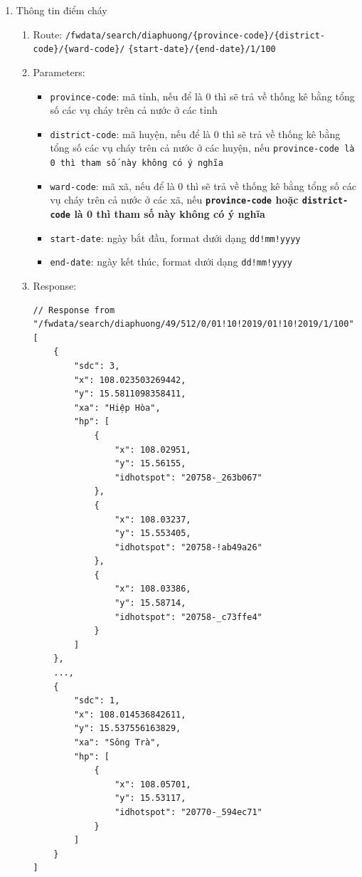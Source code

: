 \documentclass{article}
\begin{document}
\begin{enumerate}
	\item Thông tin điểm cháy
	      \begin{enumerate}
		      \item Route: {\texttt{/fwdata/search/diaphuong/\{province-code\}/\{district-code\}/\{ward-code\}/}
		            \linebreak
		            \texttt{\{start-date\}/\{end-date\}/1/100}
		            }
		      \item Parameters:
		            \begin{itemize}
			            \item \texttt{province-code}: mã tỉnh, nếu để là 0 thì sẽ trả về thống kê bằng tổng số các vụ cháy trên cả nước ở các tỉnh
			            \item \texttt{district-code}: mã huyện, nếu để là 0 thì sẽ trả về thống kê bằng tổng số các vụ cháy trên cả nước ở các huyện, nếu \texttt{province-code là 0 thì tham số này không có ý nghĩa}
			            \item \texttt{ward-code}: mã xã, nếu để là 0 thì sẽ trả về thống kê bằng tổng số các vụ cháy trên cả nước ở các xã, nếu \textbf{\texttt{province-code} hoặc \texttt{district-code} là 0 thì tham số này không có ý nghĩa}
			            \item \texttt{start-date}: ngày bắt đầu, format dưới dạng \texttt{dd!mm!yyyy}
			            \item \texttt{end-date}: ngày kết thúc, format dưới dạng \texttt{dd!mm!yyyy}
		            \end{itemize}
		      \item Response:
		            \begin{verbatim}
// Response from "/fwdata/search/diaphuong/49/512/0/01!10!2019/01!10!2019/1/100"
[
    {
        "sdc": 3,
        "x": 108.023503269442,
        "y": 15.5811098358411,
        "xa": "Hiệp Hòa",
        "hp": [
            { 
				"x": 108.02951,
				"y": 15.56155,
				"idhotspot": "20758-_263b067"
			},
            {
				"x": 108.03237,
				"y": 15.553405,
				"idhotspot": "20758-!ab49a26"
			},
            {
				"x": 108.03386,
				"y": 15.58714,
				"idhotspot": "20758-_c73ffe4"
			}
        ]
    },
	...,
    {
        "sdc": 1,
        "x": 108.014536842611,
        "y": 15.537556163829,
        "xa": "Sông Trà",
        "hp": [
			{ 
				"x": 108.05701,
				"y": 15.53117,
				"idhotspot": "20770-_594ec71"
			}
		]
    }
]

					\end{verbatim}
	      \end{enumerate}
\end{enumerate}
\end{document}
